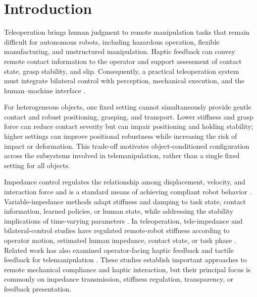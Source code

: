 \section{Introduction}

Teleoperation brings human judgment to remote manipulation tasks that remain difficult for autonomous robots, including hazardous operation, flexible manufacturing, and unstructured manipulation. Haptic feedback can convey remote contact information to the operator and support assessment of contact state, grasp stability, and slip. Consequently, a practical teleoperation system must integrate bilateral control with perception, mechanical execution, and the human--machine interface \cite{ref01,ref02}.

For heterogeneous objects, one fixed setting cannot simultaneously provide gentle contact and robust positioning, grasping, and transport. Lower stiffness and grasp force can reduce contact severity but can impair positioning and holding stability; higher settings can improve positional robustness while increasing the risk of impact or deformation. This trade-off motivates object-conditioned configuration across the subsystems involved in telemanipulation, rather than a single fixed setting for all objects.

Impedance control regulates the relationship among displacement, velocity, and interaction force and is a standard means of achieving compliant robot behavior \cite{ref03}. Variable-impedance methods adapt stiffness and damping to task state, contact information, learned policies, or human state, while addressing the stability implications of time-varying parameters \cite{ref04,ref05}. In teleoperation, tele-impedance and bilateral-control studies have regulated remote-robot stiffness according to operator motion, estimated human impedance, contact state, or task phase \cite{ref06,ref07,ref08,ref09,ref18,ref19,ref20}. Related work has also examined operator-facing haptic feedback and tactile feedback for telemanipulation \cite{ref17,ref22,ref25}. These studies establish important approaches to remote mechanical compliance and haptic interaction, but their principal focus is commonly on impedance transmission, stiffness regulation, transparency, or feedback presentation.

